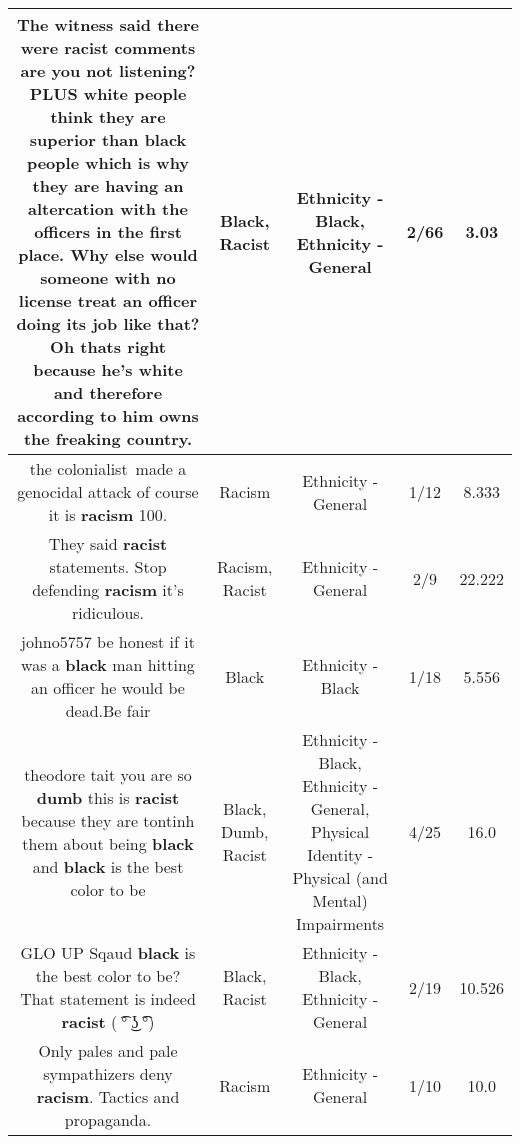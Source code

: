 \documentclass[11pt]{article}
\newlength\mylength
\begin{document}
\begin{center}
\begin{longtable}{|C{.65\mylength}|C{.30\mylength}|C{.12\mylength}|C{.12\mylength}|C{.12\mylength}|}
  \small The witness said there were \textbf{racist} comments are you not listening? PLUS white people think they are superior than \textbf{black} people which is why they are having an altercation with the officers in the first place. Why else would someone with no license treat an officer doing its job like that? Oh thats right because he's white and therefore according to him owns the freaking country.\normalsize   & Black, Racist & Ethnicity - Black, Ethnicity - General & 2/66 & 3.03 \\  \hline
  \small the colonialist made a genocidal attack of course it is \textbf{racism} 100.\normalsize   & Racism & Ethnicity - General & 1/12 & 8.333 \\  \hline
  \small They said \textbf{racist} statements. Stop defending \textbf{racism} it's ridiculous.\normalsize   & Racism, Racist & Ethnicity - General & 2/9 & 22.222 \\  \hline
  \small johno5757 be honest if it was a \textbf{black} man hitting an officer he would be dead.Be fair\normalsize   & Black & Ethnicity - Black & 1/18 & 5.556 \\  \hline
  \small theodore tait you are so \textbf{dumb} this is \textbf{racist} because they are tontinh them about being \textbf{black} and \textbf{black} is the best color to be\normalsize   & Black, Dumb, Racist & Ethnicity - Black, Ethnicity - General, Physical Identity - Physical (and Mental) Impairments & 4/25 & 16.0 \\  \hline
  \small GLO UP Sqaud \textbf{black} is the best color to be? That statement is indeed \textbf{racist} ( ͡° ͜ʖ ͡°)\normalsize   & Black, Racist & Ethnicity - Black, Ethnicity - General & 2/19 & 10.526 \\  \hline
  \small Only pales and pale sympathizers deny \textbf{racism}. Tactics and propaganda.\normalsize   & Racism & Ethnicity - General & 1/10 & 10.0 \\  \hline

\end{longtable}
\end{center}
\end{document}
